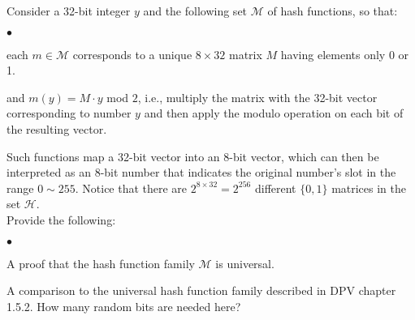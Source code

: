 \documentclass{article}
\newenvironment{myitem}{\begin{list}{$\bullet$}
{\setlength{\itemsep}{-0pt}
\setlength{\topsep}{0pt}
\setlength{\labelwidth}{0pt}
\setlength{\leftmargin}{10pt}
\setlength{\parsep}{-0pt}
\setlength{\itemsep}{0pt}
\setlength{\partopsep}{0pt}}}%
{\end{list}}
\begin{document}
\noindent Consider a 32-bit integer $y$ and the following set $\mathcal{M}$ of
hash functions, so that:
\begin{myitem}
\item each $m \in \mathcal{M}$ corresponds to a unique $8 \times 32$
  matrix $M$ having elements only 0 or 1.
\item and $m(y) = M \cdot y$ mod $2$, i.e., multiply the matrix with
  the 32-bit vector corresponding to number $y$ and then apply the
  modulo operation on each bit of the resulting vector.\\
\end{myitem}

\noindent Such functions map a 32-bit vector into an 8-bit vector,
which can then be interpreted as an 8-bit number that indicates the
original number's slot in the range $0 \sim 255$. Notice that there
are $2^{8\times32}=2^{256}$ different $\{0,1\}$ matrices in the set
$\mathcal{H}$.\\

\noindent Provide the following:
\begin{myitem}
\item A proof that the hash function family $\mathcal{M}$ is
  universal.

\item A comparison to the universal hash function family described in
  DPV chapter 1.5.2. How many random bits are needed here?\\
\end{myitem}

\newpage
\end{document}
